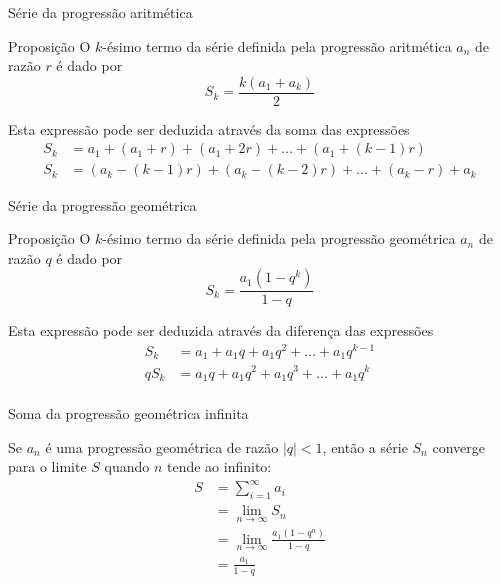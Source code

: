 \begin{frame}[fragile]{Série da progressão aritmética}

    \begin{block}{Proposição}
        O $k$-ésimo termo da série definida pela progressão aritmética $a_n$ de razão $r$ é dado por
        $$
            S_k = \frac{k(a_1 + a_k)}{2}
        $$
    \end{block}

    \vspace{0.2in}

Esta expressão pode ser deduzida através da soma das expressões
$$
\begin{array}{rl}
    S_k\! \! \! \! &= a_1 + (a_1 + r) + (a_1 + 2r) + \ldots + (a_1 + (k - 1)r) \\
    S_k\! \! \! \! &= (a_k - (k - 1)r) + (a_k - (k - 2)r) + \ldots + (a_k - r) + a_k
\end{array}
$$
\end{frame}

\begin{frame}[fragile]{Série da progressão geométrica}

    \begin{block}{Proposição}
        O $k$-ésimo termo da série definida pela progressão geométrica $a_n$ de razão $q$ é dado por
        $$
            S_k = \frac{a_1(1 - q^k)}{1 - q}
        $$
    \end{block}

    \vspace{0.2in}

Esta expressão pode ser deduzida através da diferença das expressões
$$
\begin{array}{rl}
    S_k\! \! \! \! &= a_1 + a_1q + a_1q^2 + \ldots + a_1q^{k - 1} \\
    qS_k\! \! \! \! &= a_1q + a_1q^2 + a_1q^3 + \ldots + a_1q^k \\
\end{array}
$$
\end{frame}

\begin{frame}[fragile]{Soma da progressão geométrica infinita}

Se $a_n$ é uma progressão geométrica de razão $|q| < 1$, então a série $S_n$ converge para o limite $S$ quando $n$ tende ao infinito:
\begin{align*}
    S &= \sum_{i = 1}^\infty a_i \\
      &= \lim_{n\to \infty} S_n \\
      & = \lim_{n\to \infty} \frac{a_1(1 - q^n)}{1 - q}\\
      & = \frac{a_1}{1 - q}
\end{align*}

\end{frame}

